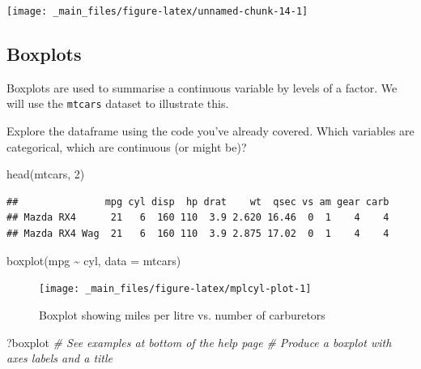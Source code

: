 \documentclass[
  11pt,
  a4paper,
]{book}
\newenvironment{Shaded}{\begin{snugshade}}{\end{snugshade}}
\newcommand{\AttributeTok}[1]{\textcolor[rgb]{0.77,0.63,0.00}{#1}}
\newcommand{\CommentTok}[1]{\textcolor[rgb]{0.56,0.35,0.01}{\textit{#1}}}
\newcommand{\DecValTok}[1]{\textcolor[rgb]{0.00,0.00,0.81}{#1}}
\newcommand{\FunctionTok}[1]{\textcolor[rgb]{0.00,0.00,0.00}{#1}}
\newcommand{\NormalTok}[1]{#1}
\newcommand{\SpecialCharTok}[1]{\textcolor[rgb]{0.00,0.00,0.00}{#1}}
\begin{document}
\begin{center}\texttt{[image: \_main\_files/figure-latex/unnamed-chunk-14-1]} \end{center}

\hypertarget{boxplots}{%
\subsection{Boxplots}\label{boxplots}}

Boxplots are used to summarise a continuous variable by levels of a factor. We will use the \texttt{mtcars} dataset to illustrate this.

Explore the dataframe using the code you've already covered. Which variables are categorical, which are continuous (or might be)?

\begin{Shaded}
\begin{Highlighting}[]
\FunctionTok{head}\NormalTok{(mtcars, }\DecValTok{2}\NormalTok{)}
\end{Highlighting}
\end{Shaded}

\begin{verbatim}
##               mpg cyl disp  hp drat    wt  qsec vs am gear carb
## Mazda RX4      21   6  160 110  3.9 2.620 16.46  0  1    4    4
## Mazda RX4 Wag  21   6  160 110  3.9 2.875 17.02  0  1    4    4
\end{verbatim}

\begin{Shaded}
\begin{Highlighting}[]
\FunctionTok{boxplot}\NormalTok{(mpg }\SpecialCharTok{\textasciitilde{}}\NormalTok{ cyl, }\AttributeTok{data =}\NormalTok{ mtcars)}
\end{Highlighting}
\end{Shaded}

\begin{figure}

{\centering \texttt{[image: \_main\_files/figure-latex/mplcyl-plot-1]} 

}

\caption{Boxplot showing miles per litre vs. number of carburetors}\label{fig:mplcyl-plot}
\end{figure}

\begin{Shaded}
\begin{Highlighting}[]
\NormalTok{?boxplot}
\CommentTok{\# See examples at bottom of the help page}
\CommentTok{\# Produce a boxplot with axes labels and a title}
\end{Highlighting}
\end{Shaded}
\end{document}
